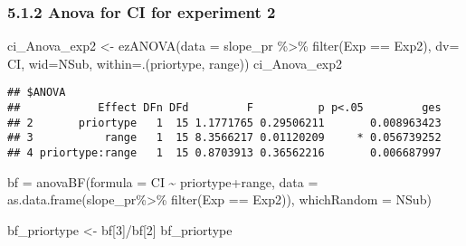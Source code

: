 \documentclass[
]{article}
\newenvironment{Shaded}{\begin{snugshade}}{\end{snugshade}}
\newcommand{\AttributeTok}[1]{\textcolor[rgb]{0.77,0.63,0.00}{#1}}
\newcommand{\DecValTok}[1]{\textcolor[rgb]{0.00,0.00,0.81}{#1}}
\newcommand{\FunctionTok}[1]{\textcolor[rgb]{0.00,0.00,0.00}{#1}}
\newcommand{\NormalTok}[1]{#1}
\newcommand{\OtherTok}[1]{\textcolor[rgb]{0.56,0.35,0.01}{#1}}
\newcommand{\SpecialCharTok}[1]{\textcolor[rgb]{0.00,0.00,0.00}{#1}}
\newcommand{\StringTok}[1]{\textcolor[rgb]{0.31,0.60,0.02}{#1}}
\begin{document}
\hypertarget{anova-for-ci-for-experiment-2}{%
\subsubsection{5.1.2 Anova for CI for experiment
2}\label{anova-for-ci-for-experiment-2}}

\begin{Shaded}
\begin{Highlighting}[]
\NormalTok{ci\_Anova\_exp2 }\OtherTok{\textless{}{-}} \FunctionTok{ezANOVA}\NormalTok{(}\AttributeTok{data =}\NormalTok{ slope\_pr }\SpecialCharTok{\%\textgreater{}\%} \FunctionTok{filter}\NormalTok{(Exp }\SpecialCharTok{==} \StringTok{\textquotesingle{}Exp2\textquotesingle{}}\NormalTok{), }\AttributeTok{dv=}\NormalTok{ CI, }\AttributeTok{wid=}\NormalTok{NSub, }\AttributeTok{within=}\NormalTok{.(priortype, range))}
\NormalTok{ci\_Anova\_exp2}
\end{Highlighting}
\end{Shaded}

\begin{verbatim}
## $ANOVA
##            Effect DFn DFd         F          p p<.05         ges
## 2       priortype   1  15 1.1771765 0.29506211       0.008963423
## 3           range   1  15 8.3566217 0.01120209     * 0.056739252
## 4 priortype:range   1  15 0.8703913 0.36562216       0.006687997
\end{verbatim}

\begin{Shaded}
\begin{Highlighting}[]
\NormalTok{bf }\OtherTok{=} \FunctionTok{anovaBF}\NormalTok{(}\AttributeTok{formula =}\NormalTok{ CI }\SpecialCharTok{\textasciitilde{}}\NormalTok{ priortype}\SpecialCharTok{+}\NormalTok{range, }\AttributeTok{data =} \FunctionTok{as.data.frame}\NormalTok{(slope\_pr}\SpecialCharTok{\%\textgreater{}\%} \FunctionTok{filter}\NormalTok{(Exp }\SpecialCharTok{==} \StringTok{\textquotesingle{}Exp2\textquotesingle{}}\NormalTok{)), }\AttributeTok{whichRandom =} \StringTok{\textquotesingle{}NSub\textquotesingle{}}\NormalTok{)}
\end{Highlighting}
\end{Shaded}

\begin{Shaded}
\begin{Highlighting}[]
\NormalTok{ bf\_priortype }\OtherTok{\textless{}{-}}\NormalTok{ bf[}\DecValTok{3}\NormalTok{]}\SpecialCharTok{/}\NormalTok{bf[}\DecValTok{2}\NormalTok{]}
\NormalTok{ bf\_priortype}
\end{Highlighting}
\end{Shaded}
\end{document}

